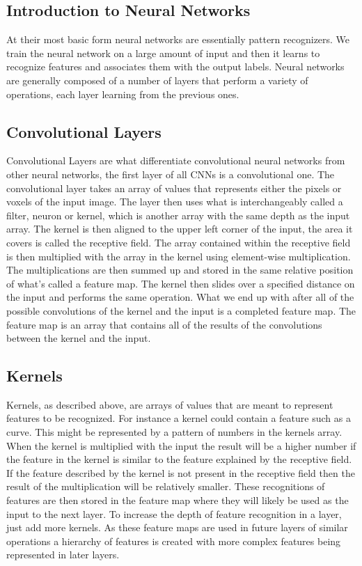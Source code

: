 \documentclass{sig-alternate}
\begin{document}
\subsection{Introduction to Neural Networks}
\label{sec:introNeuralNetworks}

At their most basic form neural networks are essentially pattern recognizers. We train the neural network on a large amount of input and then it learns to recognize features and associates them with the output labels. Neural networks are generally composed of a number of layers that perform a variety of operations, each layer learning from the previous ones.

\subsection{Convolutional Layers}
\label{sec:convolutionalLayers}

Convolutional Layers are what differentiate convolutional neural networks from other neural networks, the first layer of all CNNs is a convolutional one. The convolutional layer takes an array of values that represents either the pixels or voxels of the input image. The layer then uses what is interchangeably called a filter, neuron or kernel, which is another array with the same depth as the input array. The kernel is then aligned to the upper left corner of the input, the area it covers is called the receptive field. The array contained within the receptive field is then multiplied with the array in the kernel using element-wise multiplication. The multiplications are then summed up and stored in the same relative position of what's called a feature map. The kernel then slides over a specified distance on the input and performs the same operation. What we end up with after all of the possible convolutions of the kernel and the input is a completed feature map. The feature map is an array that contains all of the results of the convolutions between the kernel and the input.

\subsection{Kernels}
\label{sec:kernels}

Kernels, as described above, are arrays of values that are meant to represent features to be recognized. For instance a kernel could contain a feature such as a curve. This might be represented by a pattern of numbers in the kernels array. When the kernel is multiplied with the input the result will be a higher number if the feature in the kernel is similar to the feature explained by the receptive field. If the feature described by the kernel is not present in the receptive field then the result of the multiplication will be relatively smaller. These recognitions of features are then stored in the feature map where they will likely be used as the input to the next layer. To increase the depth of feature recognition in a layer, just add more kernels. As these feature maps are used in future layers of similar operations a hierarchy of features is created with more complex features being represented in later layers.
\end{document}
